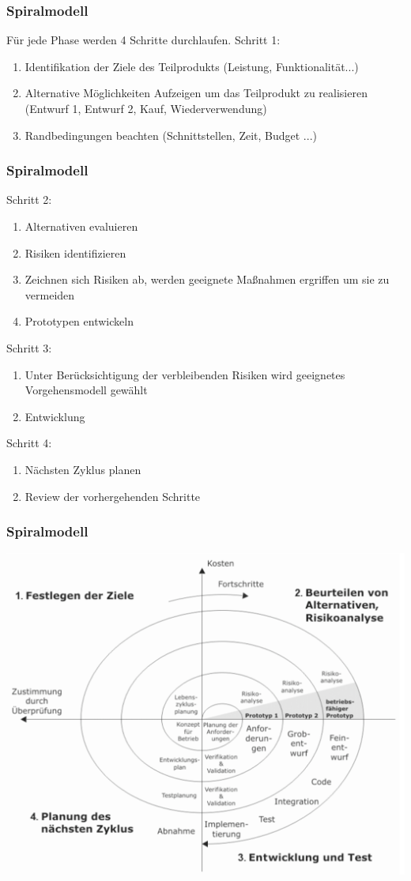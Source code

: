 \begin{frame}
\frametitle{Spiralmodell}
	Für jede Phase werden 4 Schritte durchlaufen.
	\newline\newline
	Schritt 1:
	\begin{enumerate}
		\item Identifikation der Ziele des Teilprodukts (Leistung, Funktionalität...)
		\item Alternative Möglichkeiten Aufzeigen um das Teilprodukt zu realisieren 
		(Entwurf 1, Entwurf 2, Kauf, Wiederverwendung)
		\item Randbedingungen beachten (Schnittstellen, Zeit, Budget ...)
	\end{enumerate}
\end{frame}

\begin{frame}
\frametitle{Spiralmodell}
	Schritt 2:
	\begin{enumerate}
		\item Alternativen evaluieren 
		\item Risiken identifizieren
		\item Zeichnen sich Risiken ab, werden geeignete Maßnahmen ergriffen 
		um sie zu vermeiden
		\item Prototypen entwickeln
	\end{enumerate}
	\bigskip
	Schritt 3:
	\begin{enumerate}
		\item Unter Berücksichtigung der verbleibenden Risiken wird geeignetes
		Vorgehensmodell gewählt
		\item Entwicklung
	\end{enumerate}
	\bigskip
	Schritt 4:
	\begin{enumerate}
		\item Nächsten Zyklus planen
		\item Review der vorhergehenden Schritte
	\end{enumerate}
\end{frame}

\begin{frame}
\frametitle{Spiralmodell}
	\center\includegraphics[width=1\textwidth,
			keepaspectratio=true]{bilder/spiralmodell.png}
\end{frame}

